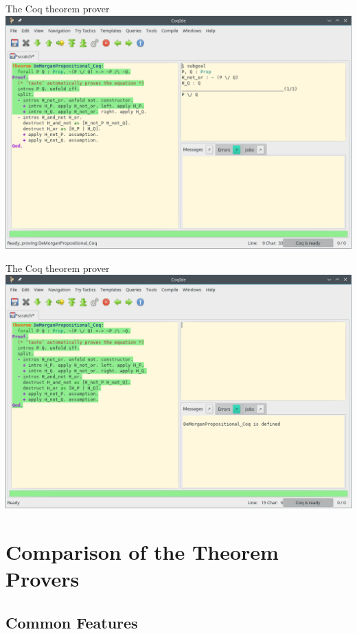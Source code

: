 \documentclass[aspectratio=169, fleqn]{beamer}
\begin{document}
\begin{frame}{The Coq theorem prover}
\includegraphics[scale=0.4]{img/coq.png}
\end{frame}

\begin{frame}{The Coq theorem prover}
\includegraphics[scale=0.4]{img/coq_qed.png}
\end{frame}


\section{Comparison of the Theorem Provers}

\subsection{Common Features}
\end{document}
